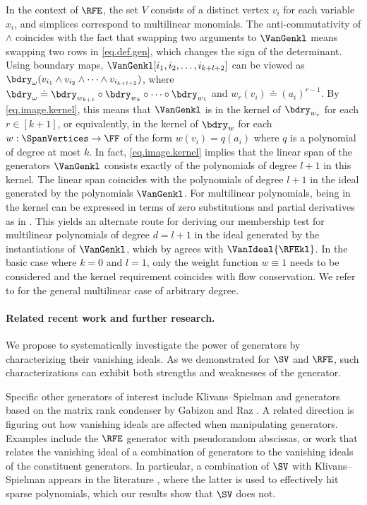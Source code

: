 In the context of \(\RFE\),
the set $V$ consists of a distinct vertex $v_i$ for each variable $x_i$,
and simplices correspond to multilinear monomials.
The anti-commutativity of $\wedge$ coincides with the fact that swapping two
arguments to \(\VanGenkl\) means swapping two rows in \eqref{eq.def.gen},
which changes the sign of the determinant.
Using boundary maps, $\VanGenkl[i_1,i_2,\dots,i_{k+l+2}]$
can be viewed as
$\bdry_{\omega} (v_{i_1} \wedge v_{i_2} \wedge \dots \wedge v_{i_{k+l+2}})$, 
where
\(\bdry_{\omega} \doteq \bdry_{w_{k+1}} \circ \bdry_{w_k} \circ \dots \circ
\bdry_{w_1}\) and
$w_r(v_i) \doteq (a_i)^{r-1}$.
By \eqref{eq.image.kernel},
this means that $\VanGenkl$ is in the kernel of $\bdry_{w_r}$ for each
$r \in [k+1]$,
or equivalently,
in the kernel of $\bdry_w$ for each $w: \SpanVertices \to \FF$
of the form $w(v_i)=q(a_i)$
where $q$ is a polynomial of degree at most $k$.
In fact,
\eqref{eq.image.kernel} implies that the linear span of the generators
$\VanGenkl$ consists exactly of the polynomials of degree $l+1$ in this
kernel. The linear span coincides with the polynomials of degree $l+1$ in the ideal generated by the polynomials $\VanGenkl$. For multilinear polynomials, being in the kernel can be expressed in terms of zero substitutions and partial derivatives as in . This yields an alternate route for deriving our membership test for multilinear polynomials of degree $d=l+1$ in the ideal generated by the instantiations of $\VanGenkl$, which by  agrees with $\VanIdeal{\RFEkl}$. In the basic case where $k=0$ and $l=1$, only the weight function $w \equiv 1$ needs to be considered and the kernel requirement coincides with flow conservation. We refer to  for the general multilinear case of arbitrary degree. 

\paragraph{Related recent work and further research.}
We propose to systematically investigate the power of generators by characterizing their vanishing ideals. As we demonstrated for $\SV$ and $\RFE$, such characterizations can exhibit both strengths and weaknesses of the generator. 

Specific other generators of interest include Klivans--Spielman \cite{KS2001} and generators based on the matrix rank condenser by Gabizon and Raz \cite{GR2008,KS2011,FS2012}.  A related direction is figuring out how vanishing ideals are affected when manipulating generators. Examples include the $\RFE$ generator with pseudorandom abscissas, or work that relates the vanishing ideal of a combination of generators to the vanishing ideals of the constituent generators. In particular, a combination of $\SV$ with Klivans--Spielman appears in the literature \cite{KMSV2009, FSS2014, FSV2018}, where the latter is used to effectively hit sparse polynomials, which our results show that $\SV$ does not.

